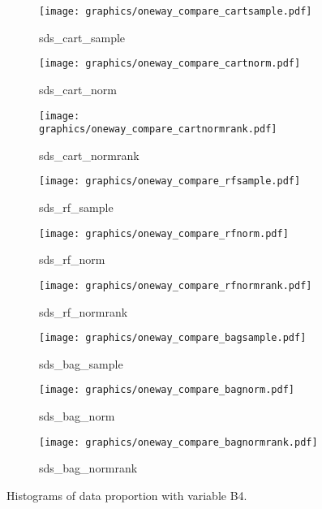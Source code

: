\begin{figure}[H]
\centering
    \begin{subfigure}{0.32\textwidth}
        \centering
        \texttt{[image: graphics/oneway\_compare\_cartsample.pdf]}  
        \caption{sds\_cart\_sample}
        \label{subfig:cartsampleb4}
    \end{subfigure}
    \begin{subfigure}{0.32\textwidth}
        \centering
        \texttt{[image: graphics/oneway\_compare\_cartnorm.pdf]}  
        \caption{sds\_cart\_norm}
        \label{subfig:cartnormb4}
    \end{subfigure}
    \begin{subfigure}{0.32\textwidth}
        \centering
        \texttt{[image: graphics/oneway\_compare\_cartnormrank.pdf]}  
        \caption{sds\_cart\_normrank}
        \label{subfig:cartnormrankb4}
    \end{subfigure}
    \medskip
    \begin{subfigure}{0.32\textwidth}
        \centering
        \texttt{[image: graphics/oneway\_compare\_rfsample.pdf]}  
        \caption{sds\_rf\_sample}
        \label{subfig:rfsampleb4}
    \end{subfigure}
    \begin{subfigure}{0.32\textwidth}
        \centering
        \texttt{[image: graphics/oneway\_compare\_rfnorm.pdf]}  
        \caption{sds\_rf\_norm}
        \label{subfig:rfnormb4}
    \end{subfigure}
    \begin{subfigure}{0.32\textwidth}
        \centering
        \texttt{[image: graphics/oneway\_compare\_rfnormrank.pdf]}  
        \caption{sds\_rf\_normrank}
        \label{subfig:rfnormrankb4}
    \end{subfigure}
    \medskip
    \begin{subfigure}{0.32\textwidth}
        \centering
        \texttt{[image: graphics/oneway\_compare\_bagsample.pdf]}  
        \caption{sds\_bag\_sample}
        \label{subfig:bagsampleb4}
    \end{subfigure}
    \begin{subfigure}{0.32\textwidth}
        \centering
        \texttt{[image: graphics/oneway\_compare\_bagnorm.pdf]}  
        \caption{sds\_bag\_norm}
        \label{subfig:bagnormb4}
    \end{subfigure}
    \begin{subfigure}{0.32\textwidth}
        \centering
        \texttt{[image: graphics/oneway\_compare\_bagnormrank.pdf]}  
        \caption{sds\_bag\_normrank}
        \label{subfig:bagnormrankb4}
    \end{subfigure}
\caption{Histograms of data proportion with variable B4.}
\label{fig:B4-1}
\end{figure}

